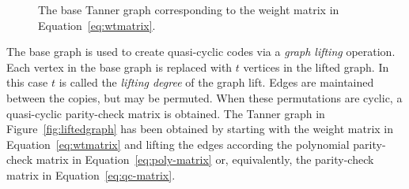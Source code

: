\documentclass[11pt]{amsart}
\theoremstyle{definition}
\newcommand{\0}{\mathbf{0}}
\begin{document}
\begin{figure}[ht]
    \centering
    \caption{The base Tanner graph corresponding to the weight matrix in Equation~\ref{eq:wtmatrix}.} \label{fig:basegraph}
\end{figure}

The base graph is used to create quasi-cyclic codes via a \textit{graph lifting} operation. Each vertex in the base graph is replaced with $t$ vertices in the lifted graph. In this case $t$ is called the \textit{lifting degree} of the graph lift. Edges are maintained between the copies, but may be permuted. When these permutations are cyclic, a quasi-cyclic parity-check matrix is obtained. The Tanner graph in Figure~\ref{fig:liftedgraph} has been obtained by starting with the weight matrix in Equation~\ref{eq:wtmatrix} and lifting the edges according the polynomial parity-check matrix in Equation~\ref{eq:poly-matrix} or, equivalently, the parity-check matrix in Equation~\ref{eq:qc-matrix}.
\end{document}
